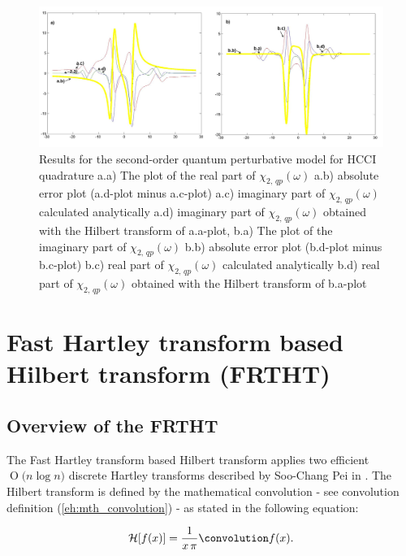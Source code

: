 \documentclass[12pt,twoside,a4paper]{article}
\numberwithin{equation}{subsection}
\numberwithin{figure}{subsection}
\newcommand{\BigO}[1]{\ensuremath{\operatorname{O}\bigl(#1\bigr)}}
\begin{document}
\begin{figure} 
  \includegraphics[width=150mm]{img/hcc_qp2.png}
  \caption{Results for the second-order quantum perturbative model for HCCI quadrature
     a.a) The plot of the real part of $\chi_{2, \, qp} (\omega )$
     a.b) absolute error plot (a.d-plot minus a.c-plot) 
     a.c) imaginary part of $\chi_{2, \, qp} (\omega )$ calculated analytically 
     a.d) imaginary part of $\chi_{2, \, qp} (\omega )$ obtained with the Hilbert transform of a.a-plot, 
     b.a) The plot of the imaginary part of ${\chi_{2, \,qp}}(\omega )$ 
     b.b) absolute error plot (b.d-plot minus b.c-plot) 
     b.c) real part of $\chi_{2, \, qp} (\omega )$ calculated analytically 
     b.d) real part of $\chi_{2, \, qp} (\omega )$ obtained with the Hilbert transform of b.a-plot 
     \label{fig:hcc_qp2}
     }
\end{figure}


\section{Fast Hartley transform based Hilbert transform (FRTHT)} \label{chap:hartley}

\subsection{Overview of the FRTHT} \label{chap:hartley_overview}

The Fast Hartley transform based Hilbert transform applies two efficient $\BigO{n \log n}$ discrete Hartley transforms described by
Soo-Chang Pei in \cite{chang_computation}. The Hilbert transform is defined by the mathematical convolution - see convolution definition
(\ref{eh:mth_convolution}) - as stated in the following equation:

\begin{equation} \label{eq:frtht_convolution}
	\mathcal{H}[f(x)] = \frac{1}{x \, \pi} \convolution f(x) .
\end{equation}
\end{document}
